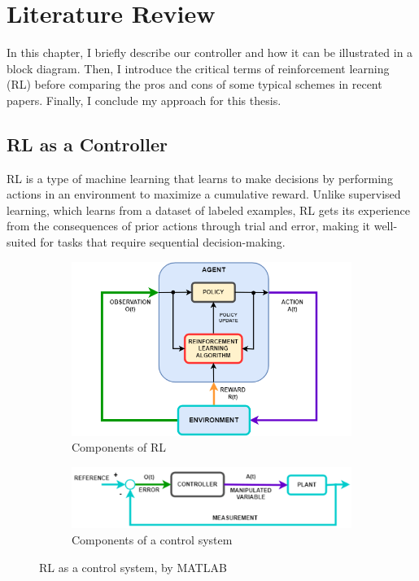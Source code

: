 \documentclass[../main.tex]{subfiles}
\begin{document}
\chapter{Literature Review} \label{chap:review}
In this chapter, I briefly describe our controller and how it can be illustrated in a block diagram. Then, I introduce the critical terms of reinforcement learning (RL) before comparing the pros and cons of some typical schemes in recent papers. Finally, I conclude my approach for this thesis.

\section{RL as a Controller} \label{sec:rl_ctrl}
RL is a type of machine learning that learns to make decisions by performing actions in an environment to maximize a cumulative reward. Unlike supervised learning, which learns from a dataset of labeled examples, RL gets its experience from the consequences of prior actions through trial and error, making it well-suited for tasks that require sequential decision-making.
\begin{figure}[htb]
    \centering
    \begin{subfigure}{0.75\textwidth}
        \includegraphics[width=\linewidth]{figures/rl_component.png}
        \caption{Components of RL}
        \label{fig:rl_component}
    \end{subfigure}
    \begin{subfigure}{0.75\textwidth}
        \centering
        \includegraphics[width=\linewidth]{figures/ctrl_component.png}
        \caption{Components of a control system}
        \label{fig:ctrl_component}
    \end{subfigure}
    \caption{RL as a control system, by MATLAB \cite{MathWorksRLControlSystems}}
    \label{fig:rl_vs_ctrl}
\end{figure}
\end{document}
